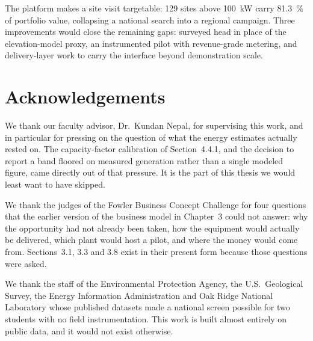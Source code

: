 \documentclass[12pt,letterpaper]{report}
\begin{document}
The platform makes a site visit targetable: 129 sites above 100~kW carry 81.3~\% of
portfolio value, collapsing a national search into a regional campaign. Three
improvements would close the remaining gaps: surveyed head in place of the
elevation-model proxy, an instrumented pilot with revenue-grade metering, and
delivery-layer work to carry the interface beyond demonstration scale.

\chapter*{Acknowledgements}
We thank our faculty advisor, Dr.\ Kundan Nepal, for supervising this work, and in
particular for pressing on the question of what the energy estimates actually rested on.
The capacity-factor calibration of Section~4.4.1, and the decision to report a band
floored on measured generation rather than a single modeled figure, came directly out of
that pressure. It is the part of this thesis we would least want to have skipped.

We thank the judges of the Fowler Business Concept Challenge for four questions that the
earlier version of the business model in Chapter~3 could not answer: why the opportunity
had not already been taken, how the equipment would actually be delivered, which plant
would host a pilot, and where the money would come from. Sections~3.1, 3.3 and 3.8 exist
in their present form because those questions were asked.

We thank the staff of the Environmental Protection Agency, the U.S.\ Geological Survey,
the Energy Information Administration and Oak Ridge National Laboratory whose published
datasets made a national screen possible for two students with no field instrumentation.
This work is built almost entirely on public data, and it would not exist otherwise.

\begin{singlespace}
\clearpage
\tableofcontents
\clearpage
{}
\listoffigures
\clearpage
{}
\listoftables
\end{singlespace}
\clearpage

\end{document}

